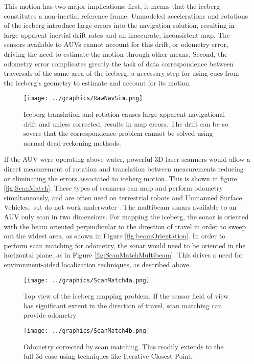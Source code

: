 This motion has two major implications: first, it means that the iceberg constitutes a non-inertial reference frame. Unmodeled accelerations and rotations of the iceberg introduce large errors into the navigation solution, resulting in large apparent inertial drift rates and an inaccurate, inconsistent map. The sensors available to AUVs cannot account for this drift, or odometry error, driving the need to estimate the motion through other means. Second, the odometry error complicates greatly the task of data correspondence between traversals of the same area of the iceberg, a necessary step for using cues from the iceberg's geometry to estimate and account for its motion.

\begin{figure}[htbp]
   \centering
   \texttt{[image: ../graphics/RawNavSim.png]} %
   \caption{Iceberg translation and rotation causes large apparent navigational drift and unless corrected, results in map errors. The drift can be so severe that the correspondence problem cannot be solved using normal dead-reckoning methods.}
   \label{fig:naiveMapping}
\end{figure}

If the AUV were operating above water, powerful 3D laser scanners would allow a direct measurement of rotation and translation between measurements reducing or eliminating the errors associated to iceberg motion. This is shown in figure \ref{fig:ScanMatch}. These types of scanners can map and perform odometry simultaneously, and are often used on terrestrial robots and Unmanned Surface Vehicles, but do not work underwater \cite{Papadopoulos2014}. The multibeam sonars available to an AUV only scan in two dimensions. For mapping the iceberg, the sonar is oriented with the beam oriented perpindicular to the direction of travel in order to sweep out the widest area, as shown in Figure \ref{fig:beamOrientation}.  In order to perform scan matching for odometry, the sonar would need to be oriented in the horizontal plane, as in Figure \ref{fig:ScanMatchMultibeam}. This drives a need for environment-aided localization techniques, as described above. 

\begin{figure}[htbp]
   \centering
   \texttt{[image: ../graphics/ScanMatch4a.png]} %
   \caption{Top view of the iceberg mapping problem. If the sensor field of view has significant extent in the direction of travel, scan matching can provide odometry}
   \label{fig:ScanMatch1}
   \end{figure}
    \begin{figure}[h]
   \centering
   \texttt{[image: ../graphics/ScanMatch4b.png]} %
   \caption{Odometry corrected by scan matching. This readily extends to the full 3d case using techniques like Iterative Closest Point.}
   \label{fig:ScanMatch2}
\end{figure}

